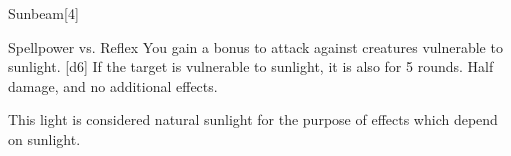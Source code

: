 \begin{spellsection}{Sunbeam}[4]
    \begin{spellheader}
    \end{spellheader}
    \begin{spellcontent}
        \begin{spelltargetinginfo}
        \end{spelltargetinginfo}
        \begin{spelleffects}
            \begin{spellattack}{Spellpower vs. Reflex}
                \spellspecial You gain a  bonus to attack against creatures vulnerable to sunlight.
                \spellsuccess {}[d6]
                \spellcritical If the target is vulnerable to sunlight, it is also \blinded for 5 rounds.
                \spellfailure Half damage, and no additional effects.
            \end{spellattack}
        \end{spelleffects}
    \end{spellcontent}
    \begin{spellfooter}
        \spellnotes This light is considered natural sunlight for the purpose of effects which depend on sunlight.
        \miscastexplode
    \end{spellfooter}
\end{spellsection}

